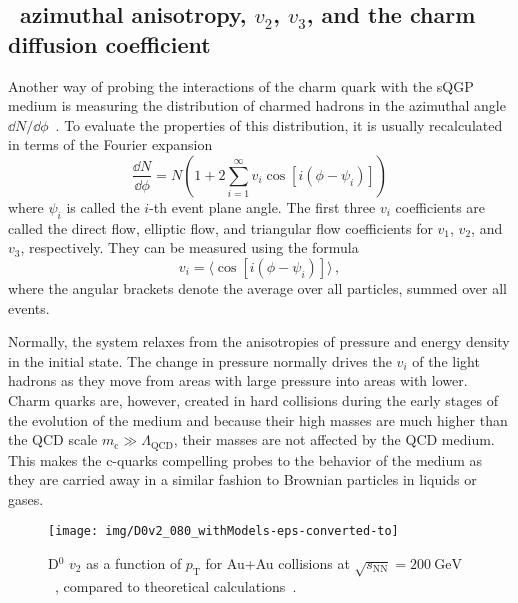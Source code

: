 \subsection{\dzero\ azimuthal anisotropy, $v_2$, $v_3$, and the charm diffusion coefficient}

Another way of probing the interactions of the charm quark with the sQGP medium is measuring the distribution of charmed hadrons in the azimuthal angle $\dd N/ \dd \phi$~\cite{StrangeAndChargedv2paper}\@. To evaluate the properties of this distribution, it is usually recalculated in terms of the Fourier expansion
\begin{equation}
\frac{\dd N}{ \dd \phi} = N \left(1 + 2\sum_{i=1}^\infty v_i \cos[i(\phi - \psi_i)] \right)
\end{equation}
where $\psi_i$ is called the $i$-th event plane angle. The first three $v_i$ coefficients are called the direct flow, elliptic flow, and triangular flow coefficients for $v_1$, $v_2$, and $v_3$, respectively. They can be measured using the formula
\begin{equation}
v_i = \langle \cos[i(\phi - \psi_i)] \rangle\,,
\end{equation}
where the angular brackets denote the average over all particles, summed over all events.

Normally, the system relaxes from the anisotropies of pressure and energy density in the initial state. The change in pressure normally drives the $v_i$ of the light hadrons as they move from areas with large pressure into areas with lower. Charm quarks are, however, created in hard collisions during the early stages of the evolution of the medium and because their high masses are much higher than the QCD scale $m_\mathrm{c} \gg \Lambda_\text{QCD}$, their masses are not affected by the QCD medium. This makes the c-quarks compelling probes to the behavior of the medium as they are carried away in a similar fashion to Brownian particles in liquids or gases. 

\begin{figure}[!htb]
\begin{center}
 \texttt{[image: img/D0v2\_080\_withModels-eps-converted-to]}\\
\end{center}
\caption{\label{dzerov2}D$^0$ $v_2$ as a function of $p_\mathrm{T}$ for Au+Au collisions
at $\sqrt{s_\mathrm{NN}} = \SI{200}{\giga\electronvolt}$~\cite{D0v2paper}, compared to theoretical calculations~\cite{PHSD2014,LBT,LBTprivate,TAMU,PHSD2015,SUBATECHvn,SUBATECHquenching,Duke,Duke2015,Hydro2012,Hydro2015}.}
\end{figure}


